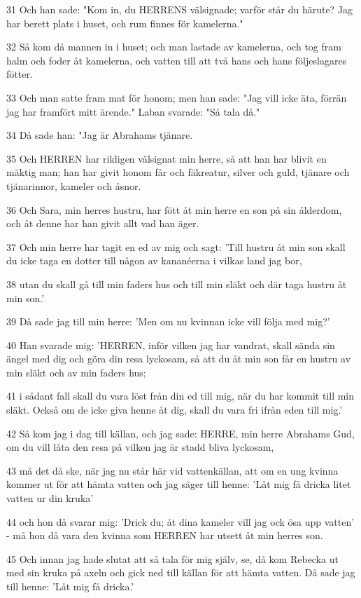 \par 31 Och han sade: "Kom in, du HERRENS välsignade; varför står du härute? Jag har berett plats i huset, och rum finnes för kamelerna."
\par 32 Så kom då mannen in i huset; och man lastade av kamelerna, och tog fram halm och foder åt kamelerna, och vatten till att två hans och hans följeslagares fötter.
\par 33 Och man satte fram mat för honom; men han sade: "Jag vill icke äta, förrän jag har framfört mitt ärende." Laban svarade: "Så tala då."
\par 34 Då sade han: "Jag är Abrahams tjänare.
\par 35 Och HERREN har rikligen välsignat min herre, så att han har blivit en mäktig man; han har givit honom får och fäkreatur, silver och guld, tjänare och tjänarinnor, kameler och åsnor.
\par 36 Och Sara, min herres hustru, har fött åt min herre en son på sin ålderdom, och åt denne har han givit allt vad han äger.
\par 37 Och min herre har tagit en ed av mig och sagt: 'Till hustru åt min son skall du icke taga en dotter till någon av kananéerna i vilkas land jag bor,
\par 38 utan du skall gå till min faders hus och till min släkt och där taga hustru åt min son.'
\par 39 Då sade jag till min herre: 'Men om nu kvinnan icke vill följa med mig?'
\par 40 Han svarade mig: 'HERREN, inför vilken jag har vandrat, skall sända sin ängel med dig och göra din resa lyckosam, så att du åt min son får en hustru av min släkt och av min faders hus;
\par 41 i sådant fall skall du vara löst från din ed till mig, när du har kommit till min släkt. Också om de icke giva henne åt dig, skall du vara fri ifrån eden till mig.'
\par 42 Så kom jag i dag till källan, och jag sade: HERRE, min herre Abrahams Gud, om du vill låta den resa på vilken jag är stadd bliva lyckosam,
\par 43 må det då ske, när jag nu står här vid vattenkällan, att om en ung kvinna kommer ut för att hämta vatten och jag säger till henne: 'Låt mig få dricka litet vatten ur din kruka'
\par 44 och hon då svarar mig: 'Drick du; åt dina kameler vill jag ock ösa upp vatten' - må hon då vara den kvinna som HERREN har utsett åt min herres son.
\par 45 Och innan jag hade slutat att så tala för mig själv, se, då kom Rebecka ut med sin kruka på axeln och gick ned till källan för att hämta vatten. Då sade jag till henne: 'Låt mig få dricka.'

